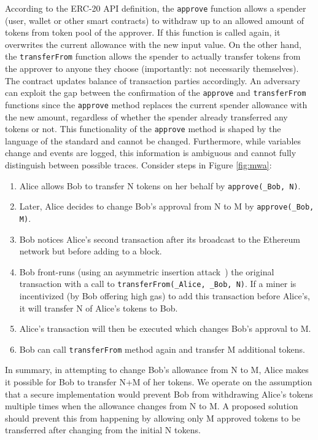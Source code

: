 According to the ERC-20 API definition, the \texttt{approve} function allows a spender (\eg user, wallet or other smart contracts) to withdraw up to an allowed amount of tokens from token pool of the approver. If this function is called again, it overwrites the current allowance with the new input value. On the other hand, the \texttt{transferFrom} function allows the spender to actually transfer tokens from the approver to anyone they choose (importantly: not necessarily themselves). The contract updates balance of transaction parties accordingly. An adversary can exploit the gap between the confirmation of the \texttt{approve} and \texttt{transferFrom} functions since the \texttt{approve} method replaces the current spender allowance with the new amount, regardless of whether the spender already transferred any tokens or not. This functionality of the \texttt{approve} method is shaped by the language of the standard and cannot be changed. Furthermore, while variables change and events are logged, this information is ambiguous and cannot fully distinguish between possible traces. Consider steps in Figure \ref{fig:mwa}:

\begin{enumerate}
	\item Alice allows Bob to transfer N tokens on her behalf by \texttt{approve(\_Bob, N)}.
	\item Later, Alice decides to change Bob's approval from N to M by \texttt{approve(\_Bob, M)}.
	\item Bob notices Alice's second transaction after its broadcast to the Ethereum network but before adding to a block.
	\item Bob front-runs (using an asymmetric insertion attack~\cite{eskandari2019sok}) the original transaction with a call to \texttt{transferFrom(\_Alice, \_Bob, N)}. If a miner is incentivized (\eg by Bob offering high gas) to add this transaction before Alice's, it will transfer N of Alice's tokens to Bob.
	\item Alice's transaction will then be executed which changes Bob's approval to M.
	\item Bob can call \texttt{transferFrom} method again and transfer M additional tokens.
\end{enumerate}
In summary, in attempting to change Bob's allowance from N to M, Alice makes it possible for Bob to transfer N+M of her tokens. We operate on the assumption that a secure implementation would prevent Bob from withdrawing Alice's tokens multiple times when the allowance changes from N to M. A proposed solution should prevent this from happening by allowing only M approved tokens to be transferred after changing from the initial N tokens.


